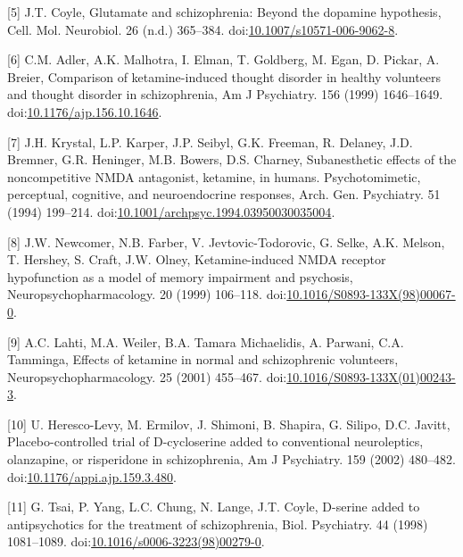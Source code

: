 \documentclass[man]{apa6}
\begin{document}
\leavevmode\hypertarget{ref-coyleGlutamateSchizophreniaDopamine2006}{}%
{[}5{]} J.T. Coyle, Glutamate and schizophrenia: Beyond the dopamine hypothesis, Cell. Mol. Neurobiol. 26 (n.d.) 365--384. doi:\href{https://doi.org/10.1007/s10571-006-9062-8}{10.1007/s10571-006-9062-8}.

\leavevmode\hypertarget{ref-adlerComparisonKetamineinducedThought1999}{}%
{[}6{]} C.M. Adler, A.K. Malhotra, I. Elman, T. Goldberg, M. Egan, D. Pickar, A. Breier, Comparison of ketamine-induced thought disorder in healthy volunteers and thought disorder in schizophrenia, Am J Psychiatry. 156 (1999) 1646--1649. doi:\href{https://doi.org/10.1176/ajp.156.10.1646}{10.1176/ajp.156.10.1646}.

\leavevmode\hypertarget{ref-krystalSubanestheticEffectsNoncompetitive1994}{}%
{[}7{]} J.H. Krystal, L.P. Karper, J.P. Seibyl, G.K. Freeman, R. Delaney, J.D. Bremner, G.R. Heninger, M.B. Bowers, D.S. Charney, Subanesthetic effects of the noncompetitive NMDA antagonist, ketamine, in humans. Psychotomimetic, perceptual, cognitive, and neuroendocrine responses, Arch. Gen. Psychiatry. 51 (1994) 199--214. doi:\href{https://doi.org/10.1001/archpsyc.1994.03950030035004}{10.1001/archpsyc.1994.03950030035004}.

\leavevmode\hypertarget{ref-newcomerKetamineinducedNMDAReceptor1999}{}%
{[}8{]} J.W. Newcomer, N.B. Farber, V. Jevtovic-Todorovic, G. Selke, A.K. Melson, T. Hershey, S. Craft, J.W. Olney, Ketamine-induced NMDA receptor hypofunction as a model of memory impairment and psychosis, Neuropsychopharmacology. 20 (1999) 106--118. doi:\href{https://doi.org/10.1016/S0893-133X(98)00067-0}{10.1016/S0893-133X(98)00067-0}.

\leavevmode\hypertarget{ref-lahtiEffectsKetamineNormal2001}{}%
{[}9{]} A.C. Lahti, M.A. Weiler, B.A. Tamara Michaelidis, A. Parwani, C.A. Tamminga, Effects of ketamine in normal and schizophrenic volunteers, Neuropsychopharmacology. 25 (2001) 455--467. doi:\href{https://doi.org/10.1016/S0893-133X(01)00243-3}{10.1016/S0893-133X(01)00243-3}.

\leavevmode\hypertarget{ref-heresco-levyPlacebocontrolledTrialDcycloserine2002}{}%
{[}10{]} U. Heresco-Levy, M. Ermilov, J. Shimoni, B. Shapira, G. Silipo, D.C. Javitt, Placebo-controlled trial of D-cycloserine added to conventional neuroleptics, olanzapine, or risperidone in schizophrenia, Am J Psychiatry. 159 (2002) 480--482. doi:\href{https://doi.org/10.1176/appi.ajp.159.3.480}{10.1176/appi.ajp.159.3.480}.

\leavevmode\hypertarget{ref-tsaiDserineAddedAntipsychotics1998}{}%
{[}11{]} G. Tsai, P. Yang, L.C. Chung, N. Lange, J.T. Coyle, D-serine added to antipsychotics for the treatment of schizophrenia, Biol. Psychiatry. 44 (1998) 1081--1089. doi:\href{https://doi.org/10.1016/s0006-3223(98)00279-0}{10.1016/s0006-3223(98)00279-0}.
\end{document}
